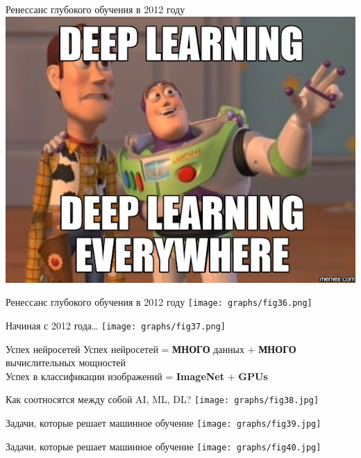 \documentclass[aspectratio=169]{beamer}
\begin{document}
\begin{frame}{Ренессанс глубокого обучения в 2012 году}
    \pause{}
    \centering
    \includegraphics[width=0.74\linewidth]{graphs/fig30.jpg}
\end{frame}

\begin{frame}{Ренессанс глубокого обучения в 2012 году}
    \centering
    \texttt{[image: graphs/fig36.png]}
\end{frame}

\begin{frame}{Начиная с 2012 года\ldots}
    \centering
    \texttt{[image: graphs/fig37.png]}
\end{frame}

\begin{frame}{Успех нейросетей}
    \centering
    \Large
    Успех нейросетей = \textbf{МНОГО} данных + \textbf{МНОГО} вычислительных
     мощностей
    \\
    Успех в классификации изображений = \textbf{ImageNet} + \textbf{GPUs}
\end{frame}

\begin{frame}{Как соотносятся между собой AI, ML, DL?}
    \centering
    \texttt{[image: graphs/fig38.jpg]}
\end{frame}

\begin{frame}{Задачи, которые решает машинное обучение}
    \centering
    \texttt{[image: graphs/fig39.jpg]}
\end{frame}

\begin{frame}{Задачи, которые решает машинное обучение}
    \centering
    \texttt{[image: graphs/fig40.jpg]}
\end{frame}
\end{document}
